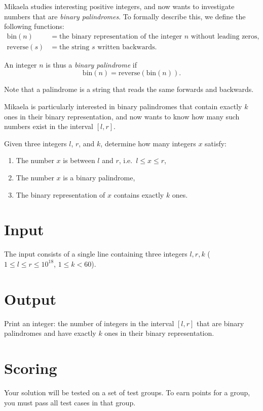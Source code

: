 \noindent

Mikaela studies interesting positive integers, and now wants to investigate numbers that are \emph{binary palindromes}.
To formally describe this, we define the following functions:
\begin{align*}
\text{bin}(n) &= \text{the binary representation of the integer } n \text{ without leading zeros},\\
\text{reverse}(s) &= \text{the string } s \text{ written backwards}.
\end{align*}

An integer $n$ is thus a \emph{binary palindrome} if
\[
\text{bin}(n) = \text{reverse}(\text{bin}(n)).
\]

Note that a palindrome is a string that reads the same forwards and backwards.

Mikaela is particularly interested in binary palindromes that contain exactly $k$ ones in their binary representation,
and now wants to know how many such numbers exist in the interval $[l, r]$.

Given three integers $l$, $r$, and $k$, determine how many integers $x$ satisfy:
\begin{enumerate}
    \item The number $x$ is between $l$ and $r$, i.e.\ $l \leq x \leq r$,
    \item The number $x$ is a binary palindrome,
    \item The binary representation of $x$ contains exactly $k$ ones.
\end{enumerate}

\section*{Input}
The input consists of a single line containing three integers $l, r, k$ ($1 \leq l \leq r \leq 10^{18}$, $1 \leq k < 60$).

\section*{Output}
Print an integer: the number of integers in the interval $[l, r]$ that are binary palindromes and have exactly $k$ ones in their binary representation.

\section*{Scoring}
Your solution will be tested on a set of test groups.
To earn points for a group, you must pass all test cases in that group.

